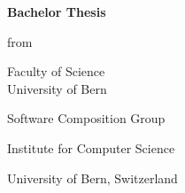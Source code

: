 \begin{titlepage}
	\begin{center}

		\begin{figure}[t]
			\vspace*{-2cm}        %
			\vspace{0.7in}
		\end{figure}

    \thispagestyle{empty}

    {\bfseries\Huge \thesistitle \par
    \Large \vspace{0.1in} \thesissubtitle \par}

    \vspace{0.3in}
    \LARGE{\textbf{Bachelor Thesis} \\}
    \vspace{0.3in}

    {\Large \thesisauthor \par from \par \thesisauthorOrigin}

    \vspace{0.3in}
    {\Large Faculty of Science \\
            University of Bern \par}
    \vspace{0.3in}
    {\Large \thesisdate \par}
    \vspace{0.3in}
   {\Large \thesisleiter} \par
      {\Large \thesisasst} \par
   \vspace{0.1in}
    {\Large Software Composition Group \par Institute for Computer Science \par University of Bern, Switzerland \par}


	\end{center}
\end{titlepage}
\linespread{1}
